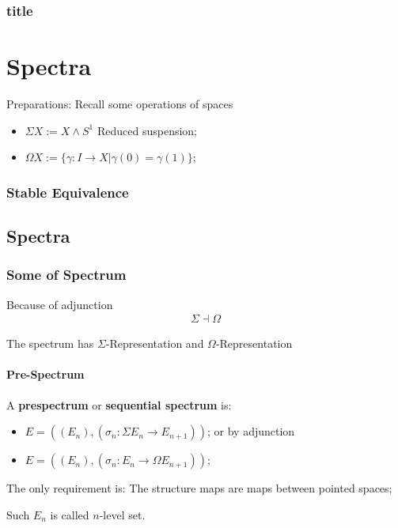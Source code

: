 \documentclass[Total.tex]{subfiles}
\begin{document}
			\subsection{title}
	\chapter{Spectra}
		Preparations: Recall some operations of spaces
		\begin{itemize}
			\item $\Sigma X:=X\wedge S^1$ Reduced suspension;
			\item $\Omega X:=\{\gamma:I\rightarrow X|\gamma(0)=\gamma(1)\}$;
		\end{itemize}
			\subsection{Stable Equivalence}
		\section{Spectra}
			
			\subsection{Some of Spectrum}
				Because of adjunction
				\begin{gather*}
					\Sigma \dashv \Omega
				\end{gather*}
				
				The spectrum has $\Sigma$-Representation and $\Omega$-Representation
				
				
				\subsubsection{Pre-Spectrum}
					\begin{Def}
						A \textbf{prespectrum} or \textbf{sequential spectrum} is:
						\begin{itemize}
							\item $E=((E_n),(\sigma_n:\Sigma E_n\rightarrow E_{n+1}))$; or by adjunction
							\item $E=((E_n),(\sigma_n:E_n\rightarrow \Omega E_{n+1}))$;
						\end{itemize}
						
						The only requirement is: The structure maps are maps between pointed spaces;
						
						Such $E_n$ is called $n$-level set.
					\end{Def}
					
\end{document}
